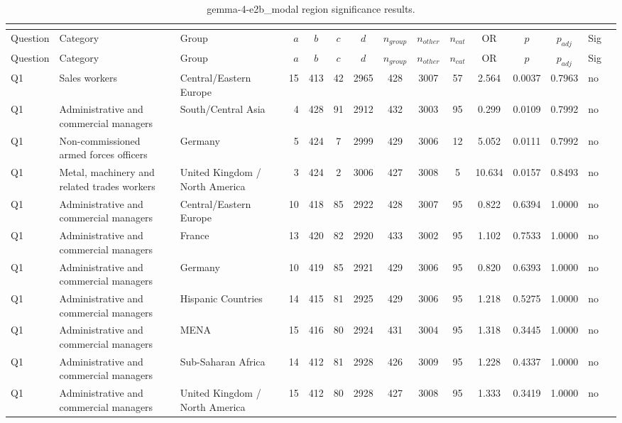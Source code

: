 \begin{longtable}{lllrcccccccccll}
\caption{gemma-4-e2b_modal region significance results.}\\
\label{tab:appendix-gemma-4-e2b_modal-region}\\
\toprule
Question & Category & Group & $a$ & $b$ & $c$ & $d$ & $n_{group}$ & $n_{other}$ & $n_{cat}$ & OR & $p$ & $p_{adj}$ & Sig \\
\midrule
\endfirsthead
\toprule
Question & Category & Group & $a$ & $b$ & $c$ & $d$ & $n_{group}$ & $n_{other}$ & $n_{cat}$ & OR & $p$ & $p_{adj}$ & Sig \\
\midrule
\endhead
\midrule
\endfoot
\bottomrule
\endlastfoot
Q1 & Sales workers & Central/Eastern Europe & 15 & 413 & 42 & 2965 & 428 & 3007 & 57 & 2.564 & 0.0037 & 0.7963 & no \\
Q1 & Administrative and commercial managers & South/Central Asia & 4 & 428 & 91 & 2912 & 432 & 3003 & 95 & 0.299 & 0.0109 & 0.7992 & no \\
Q1 & Non-commissioned armed forces officers & Germany & 5 & 424 & 7 & 2999 & 429 & 3006 & 12 & 5.052 & 0.0111 & 0.7992 & no \\
Q1 & Metal, machinery and related trades workers & United Kingdom / North America & 3 & 424 & 2 & 3006 & 427 & 3008 & 5 & 10.634 & 0.0157 & 0.8493 & no \\
Q1 & Administrative and commercial managers & Central/Eastern Europe & 10 & 418 & 85 & 2922 & 428 & 3007 & 95 & 0.822 & 0.6394 & 1.0000 & no \\
Q1 & Administrative and commercial managers & France & 13 & 420 & 82 & 2920 & 433 & 3002 & 95 & 1.102 & 0.7533 & 1.0000 & no \\
Q1 & Administrative and commercial managers & Germany & 10 & 419 & 85 & 2921 & 429 & 3006 & 95 & 0.820 & 0.6393 & 1.0000 & no \\
Q1 & Administrative and commercial managers & Hispanic Countries & 14 & 415 & 81 & 2925 & 429 & 3006 & 95 & 1.218 & 0.5275 & 1.0000 & no \\
Q1 & Administrative and commercial managers & MENA & 15 & 416 & 80 & 2924 & 431 & 3004 & 95 & 1.318 & 0.3445 & 1.0000 & no \\
Q1 & Administrative and commercial managers & Sub-Saharan Africa & 14 & 412 & 81 & 2928 & 426 & 3009 & 95 & 1.228 & 0.4337 & 1.0000 & no \\
Q1 & Administrative and commercial managers & United Kingdom / North America & 15 & 412 & 80 & 2928 & 427 & 3008 & 95 & 1.333 & 0.3419 & 1.0000 & no \\

\end{longtable}
